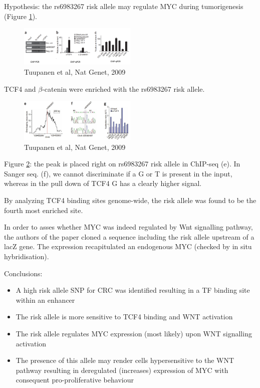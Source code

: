 Hypothesis: the rs6983267 risk allele may regulate MYC during tumorigenesis (Figure \ref{fig:rs1}).

\begin{figure}
\centering
\includegraphics[width=0.5\textwidth]{../_resources/Screenshot_2022-10-14_at_10-52-51.png}
\caption{Tuupanen et al, Nat Genet, 2009}
\label{fig:rs1}
\end{figure}

TCF4 and $\beta$-catenin were enriched with the rs6983267 risk allele.

\begin{figure}
\centering
\includegraphics[width=0.5\textwidth]{../_resources/Screenshot_2022-10-14_at_10-54-02.png}
\caption{Tuupanen et al, Nat Genet, 2009}
\label{fig:rs2}
\end{figure}

Figure \ref{fig:rs2}: the peak is placed right on rs6983267 risk allele in ChIP-seq (e). In Sanger seq. (f), we cannot discriminate if a G or T is present in the input, whereas in the pull down of TCF4 G has a clearly higher signal.

By analyzing TCF4 binding sites genome-wide, the risk allele was found to be the fourth most enriched site.

In order to asses whether MYC was indeed regulated by Wnt signalling pathway, the authors of the paper cloned a sequence including the risk allele upstream of a lacZ gene. The expression recapitulated an endogenous MYC (checked by in situ hybridisation).

Conclusions:

\begin{itemize}
\tightlist
\item
  A high risk allele SNP for CRC was identified resulting in a TF binding site within an enhancer
\item
  The risk allele is more sensitive to TCF4 binding and WNT activation
\item
  The risk allele regulates MYC expression (most likely) upon WNT signalling activation
\item
  The presence of this allele may render cells hypersensitive to the WNT pathway resulting in deregulated (increases) expression of MYC with consequent pro-proliferative behaviour
\end{itemize}

